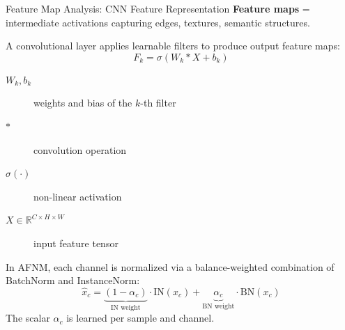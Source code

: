 \documentclass[aspectratio=169,10pt]{beamer}
\newcommand{\pos}[1]{\textcolor{positive}{#1}}
\newcommand{\HL}[1]{\textcolor{emphasis}{#1}}
\begin{document}
\begin{frame}{Feature Map Analysis: CNN Feature Representation}
  \textbf{Feature maps} = intermediate activations capturing edges, textures, semantic structures.

  \vspace{8pt}
  A convolutional layer applies learnable filters to produce output feature maps:
  \[
    F_k = \sigma(W_k \ast X + b_k)
  \]
  \begin{description}
    \item[$W_k, b_k$] weights and bias of the $k$-th filter
    \item[$\ast$] convolution operation
    \item[$\sigma(\cdot)$] non-linear activation
    \item[$X \in \mathbb{R}^{C \times H \times W}$] input feature tensor
  \end{description}

  \vspace{6pt}
  In AFNM, each channel is normalized via a \HL{balance-weighted combination} of BatchNorm and InstanceNorm:
  \[
    \hat{x}_c = \underbrace{(1-\alpha_c)}_{\text{IN weight}} \cdot \text{IN}(x_c)
               + \underbrace{\alpha_c}_{\text{BN weight}} \cdot \text{BN}(x_c)
  \]
  The scalar $\alpha_c$ is \pos{learned per sample and channel}.
\end{frame}
\end{document}

